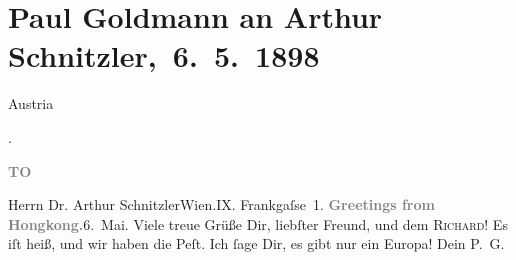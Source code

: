 

         
         \renewcommand{\erwaehntePersonen}{Personen: Richard Beer-Hofmann, Paul Goldmann}
         \renewcommand{\erwaehnteOrte}{Orte: Europa, Frankgasse, Hong Kong, Wien, Österreich}
         \renewcommand{\erwaehnteWerke}{}
               \section[ Paul Goldmann an Arthur Schnitzler, 6. 5. 1898]{ Paul Goldmann an Arthur Schnitzler, 6. 5. 1898}\nopagebreak{}\rehead{ }\begin{ledgroupsized}[t]{13cm}\normalsize\beginnumbering \toendnotes[C]{\smallbreak\pagebreak[2]} 
\pstart{}{\pb}\begin{otherlanguage}{english}Austria\end{otherlanguage}.\pend{}\pstart{}\begin{otherlanguage}{english}\textcolor{gray}{\textbf{TO}}\end{otherlanguage}\pend{}\pstart{}Herrn Dr. Arthur Schnitzler\pend{}\pstart{}Wien.\pend{}\pstart{}IX. Frankgaſse 1.\pend{}{\bigskip}\pstart
           \noindent{}{\pb}\textcolor{gray}{\textbf{Greetings from Hongkong.}}\hfill 6. Mai.\pend
           \pstart
           Viele treue Grüße Dir, liebſter Freund, und dem \textsc{Richard}! Es iſt heiß, und wir haben die Peſt. Ich ſage Dir, es gibt nur ein Europa! Dein \spacefill\mbox{P. G.}\pend
           
         
         \endnumbering{}\end{ledgroupsized}  \newcommand{\dateiname}{L02852}\newcommand{\titel}{Paul Goldmann an Arthur Schnitzler, 6. 5. 1898}\newcommand{\editorInnen}{Martin Anton Müller und Laura Untner}
      